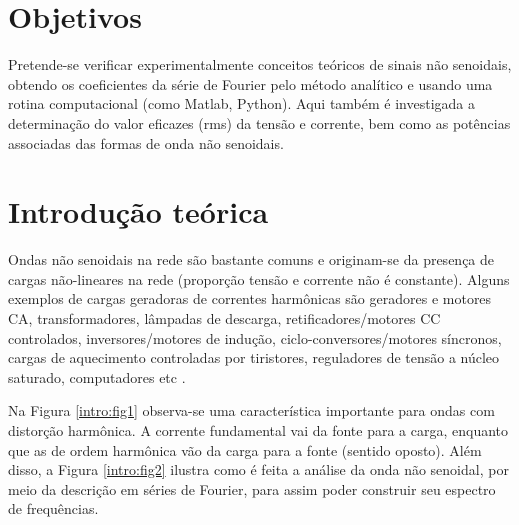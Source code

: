 \documentclass[a4paper,12pt,oneside,openany,table,xcdraw]{article}
\begin{document}
\newcommand{\thedepartment}{Faculdade de Engenharia Elétrica}
\newcommand{\thecourse}{FEELT}
\newcommand{\thetitle}{ANÁLISE DE ONDAS NÃO SENOIDAIS - LÂMPADAS (CARGAS NÃO LINEARES)}
\newcommand{\thetype}{Relatório da Disciplina de Experimental de Circuitos Elétricos II}
\newcommand{\theproftitle}{Bacharel em Engenharia Elétrica}
\newcommand{\thestudent}{Lesly Viviane Montúfar Berrios\\
\centering11811ETE001}
\newcommand{\theadvisor}{Prof. Wellington Maycon Santos Bernardes}
\newcommand{\thecity}{Uberlândia}

\thispagestyle{empty}


\onehalfspacing
\tableofcontents %
\newpage

\section{Objetivos} %
Pretende-se verificar experimentalmente conceitos teóricos de sinais não senoidais, obtendo os coeficientes da série de Fourier pelo método analítico e usando uma rotina computacional (como Matlab, Python). Aqui também é investigada a determinação do valor eficazes (rms) da tensão e corrente, bem como as potências associadas das formas de onda não senoidais.

\section{Introdução teórica} %

Ondas não senoidais na rede são bastante comuns e originam-se da presença de cargas não-lineares na rede (proporção tensão e corrente não é constante). Alguns exemplos de cargas geradoras de correntes harmônicas são geradores e motores CA, transformadores, lâmpadas de descarga, retificadores/motores CC controlados, inversores/motores de indução, ciclo-conversores/motores síncronos, cargas de aquecimento controladas por tiristores, reguladores de tensão a núcleo saturado, computadores etc \cite{PH}. 

Na Figura \ref{intro:fig1} observa-se uma característica importante para ondas com distorção harmônica. A corrente fundamental vai da fonte para a carga, enquanto que as de ordem harmônica vão da carga para a fonte (sentido oposto). Além disso, a Figura \ref{intro:fig2} ilustra como é feita a análise da onda não senoidal, por meio da descrição em séries de Fourier, para assim poder construir seu espectro de frequências.
\end{document}
